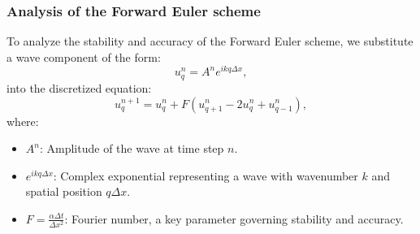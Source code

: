 \documentclass{article}
\begin{document}

		\subsubsection{Analysis of the Forward Euler scheme}
		
			To analyze the stability and accuracy of the Forward Euler scheme, we substitute a wave component of the form:
			\[
			u_q^n = A^n e^{i k q \Delta x},
			\]
			into the discretized equation:
			\[
			u_q^{n+1} = u_q^n + F \left( u_{q+1}^n - 2u_q^n + u_{q-1}^n \right),
			\]
			where:
			\begin{itemize}
				\item \( A^n \): Amplitude of the wave at time step \(n\).
				\item \( e^{i k q \Delta x} \): Complex exponential representing a wave with wavenumber \(k\) and spatial position \(q \Delta x\).
				\item \( F = \frac{\alpha \Delta t}{\Delta x^2} \): Fourier number, a key parameter governing stability and accuracy.
			\end{itemize}
			
\end{document}
